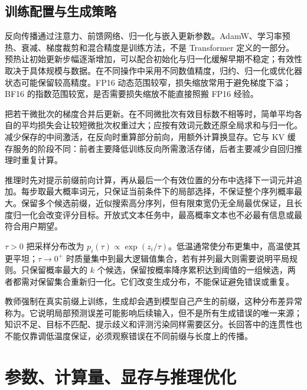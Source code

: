 \documentclass[UTF8,12pt,a4paper,fontset=fandol]{ctexart}
\begin{document}
\subsection{训练配置与生成策略}

反向传播通过注意力、前馈网络、归一化与嵌入更新参数。AdamW、学习率预热、衰减、梯度裁剪和混合精度是训练方法，不是 Transformer 定义的一部分。预热让初始更新步幅逐渐增加，可以配合初始化与归一化缓解早期不稳定；有效性取决于具体规模与数据。在不同操作中采用不同数值精度，归约、归一化或优化器状态可能保留较高精度。FP16 动态范围较窄，损失缩放常用于避免梯度下溢；BF16 的指数范围较宽，是否需要损失缩放不能直接照搬 FP16 经验。

把若干微批次的梯度合并后更新。在不同微批次有效目标数不相等时，简单平均各自的平均损失会让较短微批次权重过大；应按有效词元数还原全局求和与归一化。减少保存的中间激活，在反向时重算部分前向，用额外计算换显存。它与 KV 缓存服务的阶段不同：前者主要降低训练反向所需激活存储，后者主要减少自回归推理时重复计算。

推理时先对提示前缀前向计算，再从最后一个有效位置的分布中选择下一词元并追加。每步取最大概率词元，只保证当前条件下的局部选择，不保证整个序列概率最大。保留多个候选前缀，近似搜索高分序列，但有限束宽仍无全局最优保证，且长度归一化会改变评分目标。开放式文本任务中，最高概率文本也不必最有信息或最符合用户期望。

 $\tau>0$ 把采样分布改为 $p_i(\tau)\propto\exp(z_i/\tau)$。低温通常使分布更集中，高温使其更平坦；$\tau\to0^+$ 时质量集中到最大逻辑值集合，若有并列最大则需要说明平局规则。只保留概率最大的 $k$ 个候选，保留按概率降序累积达到阈值的一组候选，两者都需对保留集合重新归一化。它们改变生成分布，不能保证避免错误或重复。

教师强制在真实前缀上训练，生成却会遇到模型自己产生的前缀，这种分布差异常称为。它说明局部预测误差可能影响后续输入，但不是所有生成错误的唯一来源；知识不足、目标不匹配、提示歧义和评测污染同样需要区分。长回答中的连贯性也不能仅靠调低温度保证，必须观察错误在不同前缀与长度上的传播。

\section{参数、计算量、显存与推理优化}
\label{sec:tr-efficiency}
\end{document}
